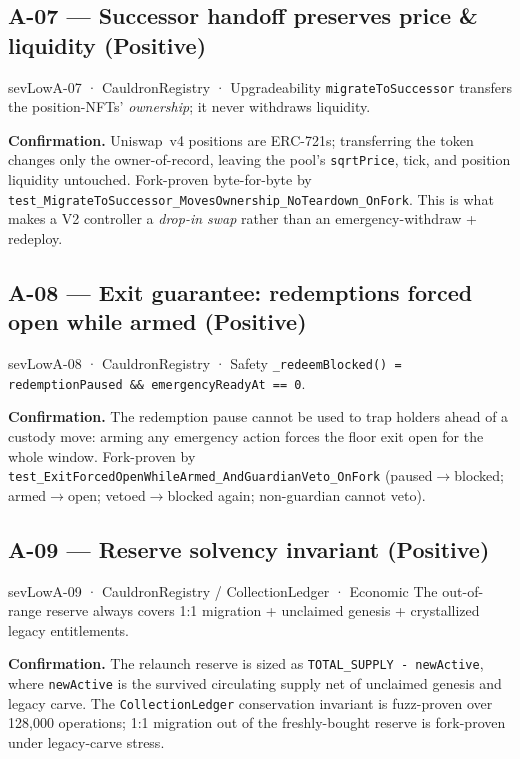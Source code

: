 \documentclass[11pt]{article}
\newcommand{\sev}[2]{\textcolor{#1}{\textbf{#2}}}
\begin{document}
\subsection{A-07 --- Successor handoff preserves price \& liquidity \sev{sevInfo}{(Positive)}}
\begin{finding}{sevLow}{A-07 · CauldronRegistry · Upgradeability}
\texttt{migrateToSuccessor} transfers the position-NFTs' \emph{ownership}; it never
withdraws liquidity.
\end{finding}

\noindent\textbf{Confirmation.} Uniswap~v4 positions are ERC-721s; transferring the token
changes only the owner-of-record, leaving the pool's \texttt{sqrtPrice}, tick, and position
liquidity untouched. Fork-proven byte-for-byte by
\texttt{test\_MigrateToSuccessor\_MovesOwnership\_NoTeardown\_OnFork}. This is what makes a
V2 controller a \emph{drop-in swap} rather than an emergency-withdraw + redeploy.

\subsection{A-08 --- Exit guarantee: redemptions forced open while armed \sev{sevInfo}{(Positive)}}
\begin{finding}{sevLow}{A-08 · CauldronRegistry · Safety}
\texttt{\_redeemBlocked() = redemptionPaused \&\& emergencyReadyAt == 0}.
\end{finding}

\noindent\textbf{Confirmation.} The redemption pause cannot be used to trap holders ahead
of a custody move: arming any emergency action forces the floor exit open for the whole
window. Fork-proven by
\texttt{test\_ExitForcedOpenWhileArmed\_AndGuardianVeto\_OnFork} (paused$\rightarrow$blocked;
armed$\rightarrow$open; vetoed$\rightarrow$blocked again; non-guardian cannot veto).

\subsection{A-09 --- Reserve solvency invariant \sev{sevInfo}{(Positive)}}
\begin{finding}{sevLow}{A-09 · CauldronRegistry / CollectionLedger · Economic}
The out-of-range reserve always covers 1:1 migration + unclaimed genesis + crystallized
legacy entitlements.
\end{finding}

\noindent\textbf{Confirmation.} The relaunch reserve is sized as
\texttt{TOTAL\_SUPPLY - newActive}, where \texttt{newActive} is the survived circulating
supply net of unclaimed genesis and legacy carve. The \texttt{CollectionLedger}
conservation invariant is fuzz-proven over 128{,}000 operations; 1:1 migration out of the
freshly-bought reserve is fork-proven under legacy-carve stress.
\end{document}
